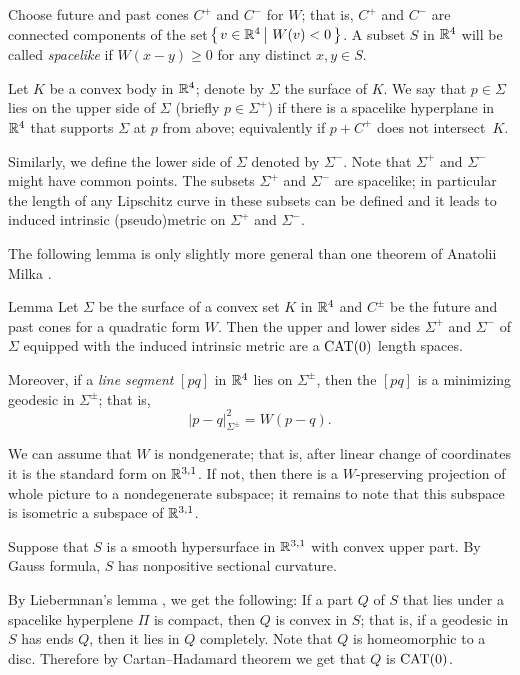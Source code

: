\documentclass{article}
\begin{document}
Choose future and past cones $C^+$ and $C^-$ for $W$;
that is, $C^+$ and $C^-$ are connected components of the set
$\set{v\in\RR^4}{W(v)< 0}$.
A subset $S$ in $\mathbb{R}^4$ will be called \emph{spacelike} if $W(x-y)\ge 0$ for any distinct $x,y\in S$.

Let $K$ be a convex body in $\mathbb{R}^4$;
denote by $\Sigma$ the surface of $K$. 
We say that $p\in \Sigma$ lies on the upper side of $\Sigma$ (briefly $p\in\Sigma^+$) if there is a spacelike hyperplane in $\mathbb{R}^4$ that supports $\Sigma$ at $p$ from above;
equivalently if $p+C^+$ does not intersect~$K$.

Similarly, we define the lower side of $\Sigma$ denoted by $\Sigma^-$.
Note that $\Sigma^+$ and $\Sigma^-$ might have common points.
The subsets $\Sigma^+$ and $\Sigma^-$ are spacelike;
in particular the length of any Lipschitz curve in these subsets can be defined and it leads to induced intrinsic (pseudo)metric on $\Sigma^+$ and $\Sigma^-$. 

The following lemma is only slightly more general than one theorem of Anatolii Milka \cite[Theorem~3]{milka}.

\begin{thm}{Lemma}\label{lem:sides}
Let $\Sigma$ be the surface of a convex set $K$ in $\mathbb{R}^4$ and $C^\pm$ be the future and past cones for a quadratic form $W$.
Then the upper and lower sides $\Sigma^+$ and $\Sigma^-$ of $\Sigma$ equipped with the induced intrinsic metric are a $\mathrm{CAT}(0)$ length spaces.

Moreover, if a \emph{line segment} $[pq]$ in $\mathbb{R}^4$ 
lies on $\Sigma^\pm$, then the $[pq]$ is a minimizing geodesic in $\Sigma^\pm$; that is,
\[|p-q|_{\Sigma^\pm}^2=W(p-q).\]

\end{thm}

We can assume that $W$ is nondgenerate; that is, after linear change of coordinates it is the standard form on $\mathbb{R}^{3,1}$.
If not, then there is a $W$-preserving projection of whole picture to a  nondegenerate subspace; it remains to note that this subspace is isometric a subspace of $\mathbb{R}^{3,1}$.

Suppose that $S$ is a smooth hypersurface in $\mathbb{R}^{3,1}$ with convex upper part.
By Gauss formula, $S$ has nonpositive sectional curvature.

By Liebermnan's lemma \cite[Theorem~3]{milka}, we get the following: 
If a part $Q$ of $S$ that lies under a spacelike hyperplene $\Pi$ is compact, then $Q$ is convex in $S$;
that is, if a geodesic in $S$ has ends $Q$, then it lies in $Q$ completely.
Note that $Q$ is homeomorphic to a disc.
Therefore by Cartan--Hadamard theorem we get that $Q$ is $\mathrm{CAT}(0)$.
\end{document}
